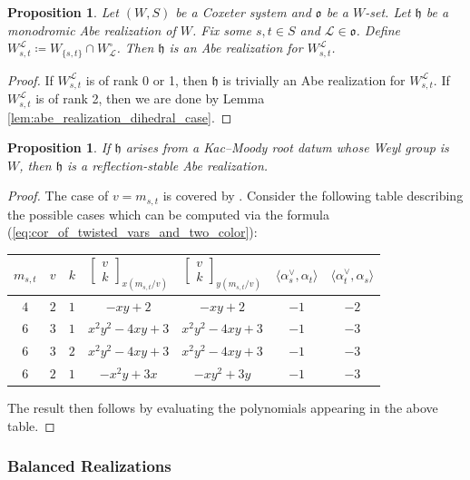 \documentclass{amsart}
\newcommand{\scrL}{\mathcal{L}}
\newcommand{\fr}[1]{\mathfrak{#1}}
\renewcommand{\binom}[2]{\begin{bmatrix} #1 \\ #2 \end{bmatrix}}
\newtheorem{proposition}[subsubsection]{Proposition}
\theoremstyle{definition}
\numberwithin{equation}{subsection}
\begin{document}
\begin{proposition}\label{prop:mon_abe_and_endo_rk_2}
    Let $(W,S)$ be a Coxeter system and $\fr{o}$ be a $W$-set.
    Let $\fr{h}$ be a monodromic Abe realization of $W$.
    Fix some $s, t\in S$ and $\scrL \in \fr{o}$.
    Define $ W_{s,t}^{\scrL} \coloneq W_{\{s,t\}} \cap W_{\scrL}^{\circ}$.
    Then $\fr{h}$ is an Abe realization for $W_{s,t}^{\scrL}$.
\end{proposition}
\begin{proof}
    If $W_{s,t}^{\scrL}$ is of rank 0 or 1, then $\fr{h}$ is trivially an Abe realization for $W_{s,t}^{\scrL}$.
    If $W_{s,t}^{\scrL}$ is of rank 2, then we are done by Lemma \ref{lem:abe_realization_dihedral_case}.
\end{proof}

\begin{proposition}\label{prop:crystallographic_abe}
    If $\fr{h}$ arises from a Kac--Moody root datum whose Weyl group is $W$, then $\fr{h}$ is a reflection-stable Abe realization.
\end{proposition}
\begin{proof}
    The case of $v = m_{s,t}$ is covered by \cite[Proposition 3.7]{Abe21}.
    Consider the following table describing the possible cases which can be computed via the formula (\ref{eq:cor_of_twisted_vars_and_two_color}):
    \begin{center}
        \begin{tabular}{c | c | c | c | c | c | c }
            $m_{s,t}$ & $v$ & $k$ & $\binom{v}{k}_{x(m_{s,t}/v)}$ & $\binom{v}{k}_{y(m_{s,t}/v)}$ & $\langle \alpha_s^{\vee}, \alpha_t \rangle$ &  $\langle \alpha_t^{\vee}, \alpha_s \rangle$ \\
            \hline
            $4$ & $2$ & $1$ & $-xy+2$ & $-xy+2$ & $-1$ & $-2$ \\
            $6$ & $3$ & $1$ & $x^2 y^2 - 4xy + 3$ & $x^2 y^2 - 4xy + 3$ & $-1$ & $-3$ \\
            $6$ & $3$ & $2$ & $x^2 y^2 - 4xy + 3$ & $x^2 y^2 - 4xy + 3$ & $-1$ & $-3$ \\
            $6$ & $2$ & $1$ & $-x^2 y + 3x$ & $-xy^2 + 3y$ & $-1$ & $-3$
        \end{tabular}
    \end{center}
    The result then follows by evaluating the polynomials appearing in the above table.
\end{proof}

\subsubsection{Balanced Realizations}
\end{document}
